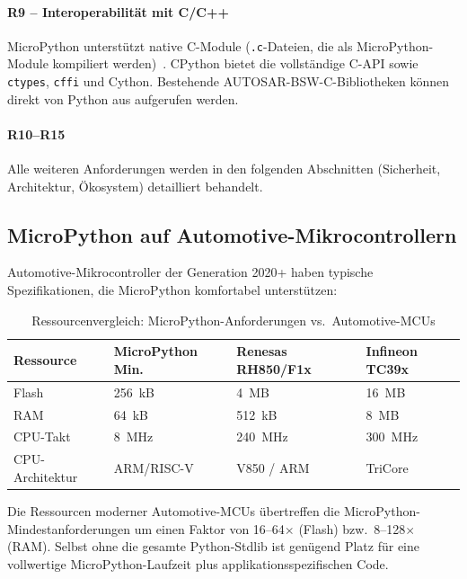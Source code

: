 ﻿\documentclass[12pt,a4paper,twoside]{article}
\begin{document}
\paragraph{R9 -- Interoperabilität mit C/C++}
MicroPython unterstützt native C-Module (\texttt{.c}-Dateien, die als
MicroPython-Module kompiliert werden)~\cite{micropython_cmodules2023}.
CPython bietet die vollständige C-API sowie \texttt{ctypes},
\texttt{cffi} und Cython. Bestehende AUTOSAR-BSW-C-Bibliotheken
können direkt von Python aus aufgerufen werden.

\paragraph{R10--R15}
Alle weiteren Anforderungen werden in den folgenden Abschnitten
(Sicherheit, Architektur, Ökosystem) detailliert behandelt.

\subsection{MicroPython auf Automotive-Mikrocontrollern}
\label{subsec:automotive_mcu}

Automotive-Mikrocontroller der Generation 2020+ haben typische Spezifikationen,
die MicroPython komfortabel unterstützen:

\begin{table}[h]
\centering
\caption{Ressourcenvergleich: MicroPython-Anforderungen vs.\ Automotive-MCUs}
\label{tab:mcu_resources}
\begin{tabular}{llll}
\toprule
\textbf{Ressource} & \textbf{MicroPython Min.} & \textbf{Renesas RH850/F1x} & \textbf{Infineon TC39x} \\
\midrule
Flash             & 256~kB           & 4~MB             & 16~MB \\
RAM               & 64~kB            & 512~kB           & 8~MB \\
CPU-Takt          & 8~MHz            & 240~MHz          & 300~MHz \\
CPU-Architektur   & ARM/RISC-V       & V850 / ARM       & TriCore \\
\bottomrule
\end{tabular}
\end{table}

Die Ressourcen moderner Automotive-MCUs übertreffen die MicroPython-Mindestanfor\-derungen
um einen Faktor von 16--64$\times$ (Flash) bzw.\ 8--128$\times$ (RAM).
Selbst ohne die gesamte Python-Stdlib ist genügend Platz für
eine vollwertige MicroPython-Laufzeit plus applikationsspezifischen Code.
\end{document}
